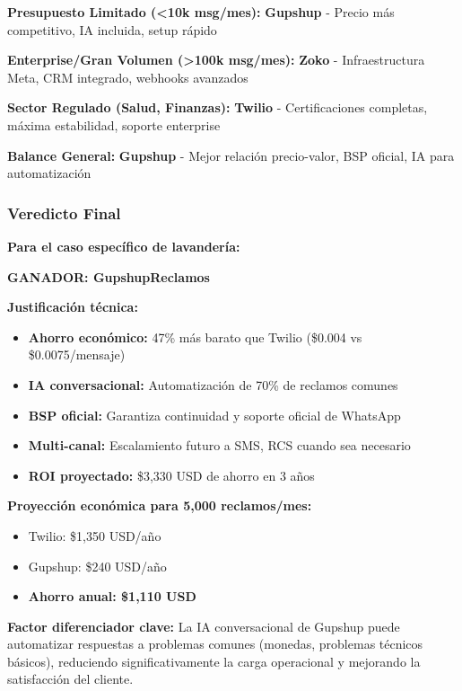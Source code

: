 \documentclass{article}
\begin{document}
\textbf{Presupuesto Limitado (<10k msg/mes):}
\textcolor{successgreen}{\textbf{Gupshup}} - Precio más competitivo, IA incluida, setup rápido

\textbf{Enterprise/Gran Volumen (>100k msg/mes):}
\textcolor{successgreen}{\textbf{Zoko}} - Infraestructura Meta, CRM integrado, webhooks avanzados

\textbf{Sector Regulado (Salud, Finanzas):}
\textcolor{successgreen}{\textbf{Twilio}} - Certificaciones completas, máxima estabilidad, soporte enterprise

\textbf{Balance General:}
\textcolor{successgreen}{\textbf{Gupshup}} - Mejor relación precio-valor, BSP oficial, IA para automatización

\subsubsection{Veredicto Final}

\textbf{Para el caso específico de lavandería:}

\textcolor{successgreen}{\textbf{GANADOR: GupshupReclamos}}

\textbf{Justificación técnica:}
\begin{itemize}[label=$\checkmark$]
    \item \textbf{Ahorro económico:} 47\% más barato que Twilio (\$0.004 vs \$0.0075/mensaje)
    \item \textbf{IA conversacional:} Automatización de 70\% de reclamos comunes
    \item \textbf{BSP oficial:} Garantiza continuidad y soporte oficial de WhatsApp
    \item \textbf{Multi-canal:} Escalamiento futuro a SMS, RCS cuando sea necesario
    \item \textbf{ROI proyectado:} \$3,330 USD de ahorro en 3 años
\end{itemize}

\textbf{Proyección económica para 5,000 reclamos/mes:}
\begin{itemize}
    \item Twilio: \$1,350 USD/año
    \item Gupshup: \$240 USD/año
    \item \textbf{Ahorro anual: \$1,110 USD}
\end{itemize}

\textbf{Factor diferenciador clave:}
La IA conversacional de Gupshup puede automatizar respuestas a problemas comunes (monedas, problemas técnicos básicos), reduciendo significativamente la carga operacional y mejorando la satisfacción del cliente.
\end{document}
